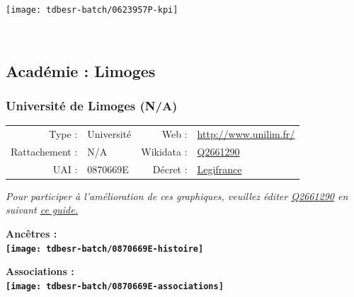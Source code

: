 \documentclass[12pt,french,]{article}
\begin{document}
\begin{center}\texttt{[image: tdbesr-batch/0623957P-kpi]} \end{center}\checkoddpage

\ifoddpage \fi ~\newpage  

\hypertarget{acaduxe9mie-limoges}{%
\subsection{Académie : Limoges}\label{acaduxe9mie-limoges}}

\hypertarget{universituxe9-de-limoges-na}{%
\subsubsection{Université de Limoges
(N/A)}\label{universituxe9-de-limoges-na}}

\begin{tabular*}{\textwidth}{rp{5cm}rl}  
\hline  
Type : & Université & Web : &\href{http://www.unilim.fr/}{http://www.unilim.fr/} \\  
Rattachement : & N/A & Wikidata : & \href{https://www.wikidata.org/entity/Q2661290}{Q2661290} \\  
UAI : & 0870669E & Décret : & \href{https://www.legifrance.gouv.fr/eli/decret/2016/12/15/MENS1630827D/jo/texte/fr}{Legifrance} \\  
\hline  
\end{tabular*}

\textit{\scriptsize Pour participer à l'amélioration de ces graphiques, veuillez éditer  \href{https://www.wikidata.org/entity/Q2661290}{Q2661290}  en suivant \href{https://github.com/cpesr/wikidataESR/blob/master/Rmd/wikidataESR.md}{ce guide.}}

\vspace{1cm}  
\begin{minipage}[b]{0.50\textwidth}\begin{center} \bf Ancêtres : \\  
\texttt{[image: tdbesr-batch/0870669E-histoire]} \end{center}\end{minipage}\begin{minipage}[b]{0.50\textwidth}\begin{center} \bf Associations : \\  
\texttt{[image: tdbesr-batch/0870669E-associations]} \end{center}\end{minipage}
\end{document}
